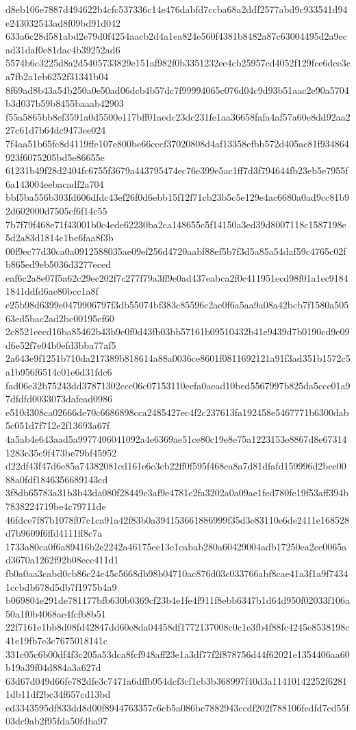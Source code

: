 {d8eb106e7887d494622b4cfc537336c14e476dabfd7ccba68a2ddf2577abd9c933541d94e243032543ad8f09bd91d042
633a6c28d581abd2e79d0f4254aacb2d4a1ea824e560f4381b8482a87c63004495d2a9ecad31daf0e81dac4b39252ad6
5574b6c3225d8a2d5405733829e151af982f0b3351232ee4cb25957cd4052f129fce6dce3ca7fb2a1eb6252f31341b04
8f69ad8b43a54b250a0e50ad06dcb4b57dc7f99994065c076d04c9d93b51aac2e90a5704b3d037b59b8455baaab42903
f55a5865bb8ef3591a0d5500e117bff01aedc23dc231fe1aa36658fafa4af57a60e8dd92aa227c61d7b64dc9473ee024
7f4aa51b65fc8d4119ffe107e800be66cccf37020808d4af13358efbb572d405ae81f934864923f6075205bd5e86655e
61231b49f28d2404fc6755f3679a443795474ec76e399e5ac1ff7d3f794644fb23eb5e7955f6a143004eebacadf2a704
bbf5ba556b303fd606dfdc43ef26f0d6ebb15f12f71cb23b5c5e129e4ac6680a0ad9cc81b92d602000d7505cf6f14c55
7b7f79f468e71f43001b0c4ede62230ba2ca148655c5f14150a3ed39d8007118c1587198e5d2a83d1814c1bc6faa8f3b
00f9ec77d30ca0a0912588035ae09ef256d4720aabf88ef5b7f3d5a85a54daf59c4765c02fb865ed9eb5036d3277eced
eaf6c2a8e07f5a62c29ec202f7c277f79a3ff9e0ad437eabca2f0c411951ecd98f01a1ec91841841ddfd6ae80bcc1a8f
e25b98d6399e0479906797f3db55074bf383c85596c2ae0f6a5aa9a08a42bcb7f1580a50563ed5bac2ad2bc00195cf60
2c8521eecd16ba85462b43b9e0f0d43fb03bb57161b09510432b41e9439d7b0190cd9e09d6e52f7e04b0efd3bba77af5
2a643e9f1251b710da217389b818614a88a0036ce8601f0811692121a91f3ad351b1572c5a1b956f6514c01e6d31fdc6
fad06e32b75243dd37871302ccc06c07153110eefa0aead10bed5567997b825da5ccc01a97dfdfd0033073dafead0986
e510d308ca02666de70c6686898cca2485427ec4f2c237613fa192458e5467771b6300dab5c051d7f712e2f13693a67f
4a5ab4e643aad5a9977406041092a4e6369ae51ce80c19e8e75a1223153e8867d8e673141283c35e9f473be79bf45952
d22df43f47d6e85a74382081cd161e6c3cb22ff0f595f468ca8a7d81dfafd159996d2bce0088a0fdf1846356689143cd
3f8db65783a31b3b43da080f28449e3af9e4781c2fa3202a0a09ae1fed780fe19f53aff394b7838224719be4c79711de
46fdce7f87b1078f07c1ca91a42f83b0a394153661886999f35d3e83110e6de2411e168528d7b9609f6ffd4111ff8c7a
1733a80ca0f6a89416b2e2242a46175ee13e1cabab280a60429004adb17250ea2ce0065ad3670a1262f92b08ecc411d1
fb0a0aa3cabd0cb86c24c45c5668db98b04710ac876d03c033766abf8cae41a3f1a9f74341ccbdb678d5db7f1975b4a9
b069804e291de781177bfb630b0369cf23b4e1fe4f911f8ebb6347b1d64d950f02033f106a50a1f0b4068ae4fcfb8b51
22f7161e1bb8d08fd42847dd60e8da04458df1772137008c0c1e3fb4f88fc4245e8538198c41e19fb7e3c7675018141c
331c05c6b00df4f3c205a53dca8fcf948aff23e1a3df77f2f878756d44f62021e1354406aa60b19a39f04d884a3a627d
63d67d049d66fe782dfe3c7471a6dffb954dcf3cf1cb3b368997f40d3a11410142252f62811db11df2bc34f657cd13bd
ed3343595df833dd8d00f8944763357c6cb5a086bc7882943ccdf202f788106fedfd7cd55f03dc9ab2f95fda50fdba97
}
